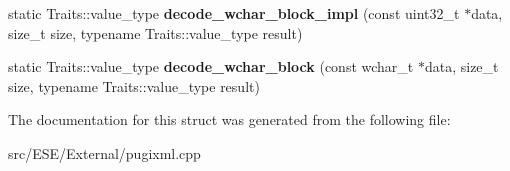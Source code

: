 \begin{DoxyCompactItemize}
\item 
\hypertarget{structutf__decoder_a3bd423d3ce99b245c76be8a0796d951b}{static Traits\-::value\-\_\-type {\bfseries decode\-\_\-wchar\-\_\-block\-\_\-impl} (const uint32\-\_\-t $\ast$data, size\-\_\-t size, typename Traits\-::value\-\_\-type result)}\label{structutf__decoder_a3bd423d3ce99b245c76be8a0796d951b}

\item 
\hypertarget{structutf__decoder_a5953fd0661c64408e08161342e4c538d}{static Traits\-::value\-\_\-type {\bfseries decode\-\_\-wchar\-\_\-block} (const wchar\-\_\-t $\ast$data, size\-\_\-t size, typename Traits\-::value\-\_\-type result)}\label{structutf__decoder_a5953fd0661c64408e08161342e4c538d}

\end{DoxyCompactItemize}


The documentation for this struct was generated from the following file\-:\begin{DoxyCompactItemize}
\item 
src/\-E\-S\-E/\-External/pugixml.\-cpp\end{DoxyCompactItemize}
